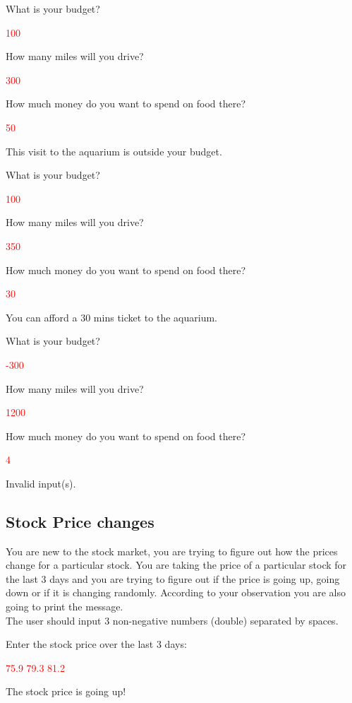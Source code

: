 \begin{sample}
What is your budget?

\textcolor{red}{100}

How many miles will you drive?

\textcolor{red}{300}

How much money do you want to spend on food there? 

\textcolor{red}{50}

This visit to the aquarium is outside your budget.
\end{sample}

\begin{sample}
What is your budget?

\textcolor{red}{100}

How many miles will you drive?

\textcolor{red}{350}

How much money do you want to spend on food there?

\textcolor{red}{30}

You can afford a 30 mins ticket to the aquarium.
\end{sample}

\begin{sample}
What is your budget?

\textcolor{red}{-300}

How many miles will you drive?

\textcolor{red}{1200}

How much money do you want to spend on food there?

\textcolor{red}{4}

Invalid input(s).
\end{sample}


\subsection{Stock Price changes}

You are new to the stock market, you are trying to figure out how the prices change for a particular stock. You are taking the price of a particular stock for the last 3 days and you are trying to figure out if the price is going up, going down or if it is changing randomly. According to your observation you are also going to print the message. \\


The user should input 3 non-negative numbers (double) separated by spaces.

\begin{sample}
Enter the stock price over the last 3 days:

\textcolor{red}{75.9 79.3 81.2}

The stock price is going up!
\end{sample}

